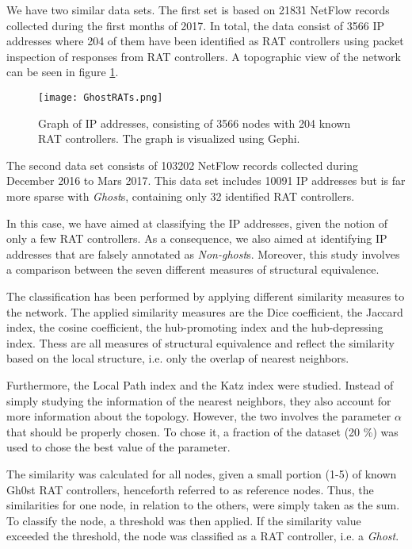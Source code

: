 We have two similar data sets. The first set is based on 21831 NetFlow records collected during the first months of 2017. In total, the data consist of 3566 IP addresses where 204 of them have been identified as RAT controllers using packet inspection of responses from RAT controllers. A topographic view of the network can be seen in figure \ref{ip1}.

\begin{figure}[h!]
    \centering
    \texttt{[image: GhostRATs.png]}
    \caption{Graph of IP addresses, consisting of 3566 nodes with 204 known RAT controllers. The graph is visualized using Gephi.}
    \label{ip1}
\end{figure}

The second data set consists of 103202 NetFlow records collected during December 2016 to Mars 2017. This data set includes 10091 IP addresses but is far more sparse with \textit{Ghost}s, containing only 32 identified RAT controllers. 

In this case, we have aimed at classifying the IP addresses, given the notion of only a few RAT controllers. As a consequence, we also aimed at identifying IP addresses that are falsely annotated as \textit{Non-ghost}s. Moreover, this study involves a comparison between the seven different measures of structural equivalence. 

The classification has been performed by applying different similarity measures to the network. The applied similarity measures are the Dice coefficient, the Jaccard index, the cosine coefficient, the hub-promoting index and the hub-depressing index. Thess are all measures of structural equivalence and reflect the similarity based on the local structure, i.e. only the overlap of nearest neighbors.

Furthermore, the Local Path index and the Katz index were studied. Instead of simply studying the information of the nearest neighbors, they also account for more information about the topology. However, the two involves the parameter $\alpha$ that should be properly chosen. To chose it, a fraction of the dataset (20 \%) was used to chose the best value of the parameter. 

The similarity was calculated for all nodes, given a small portion (1-5) of known Gh0st RAT controllers, henceforth referred to as reference nodes. Thus, the similarities for one node, in relation to the others, were simply taken as the sum. To classify the node, a threshold was then applied. If the similarity value exceeded the threshold, the node was classified as a RAT controller, i.e. a \textit{Ghost}.

